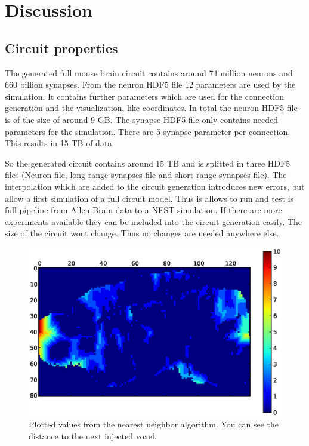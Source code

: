 %

\chapter{Discussion}


\section{Circuit properties}


The generated full mouse brain circuit contains around 74 million neurons and 660 billion synapses.
From the neuron HDF5 file 12 parameters are used by the simulation.
It contains further parameters which are used for the connection generation and the visualization,
like coordinates. In total the neuron HDF5 file is of the size of around 9 GB.
The synapse HDF5 file only contains needed parameters for the simulation.
There are 5 synapse parameter per connection. This results in 15 TB of data.

So the generated circuit contains around 15 TB and is splitted in three HDF5 files (Neuron file, long range synapses file and short range synapses file). The interpolation which are added to the circuit generation introduces new errors, but allow
a first simulation of a full circuit model. Thus is allows to run and test is full pipeline from Allen Brain data to a NEST simulation. If there are more experiments available they can be included into
the circuit generation easily. The size of the circuit wont change. Thus no changes are needed anywhere else.

\begin{figure}[ht!]
\centering
\includegraphics[scale=0.5]{pictures/distance_x_y_70.eps}
\caption{Plotted values from the nearest neighbor algorithm. You can see the distance to the next injected voxel.}
\end{figure}

